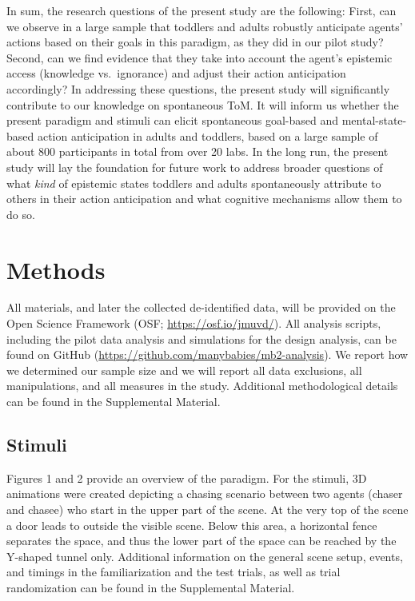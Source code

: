 \documentclass[
  man,floatsintext]{apa6}
\begin{document}
In sum, the research questions of the present study are the following: First, can we observe in a large sample that toddlers and adults robustly anticipate agents' actions based on their goals in this paradigm, as they did in our pilot study? Second, can we find evidence that they take into account the agent's epistemic access (knowledge vs.~ignorance) and adjust their action anticipation accordingly? In addressing these questions, the present study will significantly contribute to our knowledge on spontaneous ToM. It will inform us whether the present paradigm and stimuli can elicit spontaneous goal-based and mental-state-based action anticipation in adults and toddlers, based on a large sample of about 800 participants in total from over 20 labs. In the long run, the present study will lay the foundation for future work to address broader questions of what \emph{kind} of epistemic states toddlers and adults spontaneously attribute to others in their action anticipation and what cognitive mechanisms allow them to do so.

\section{Methods}\label{methods}

All materials, and later the collected de-identified data, will be provided on the Open Science Framework (OSF; \url{https://osf.io/jmuvd/}). All analysis scripts, including the pilot data analysis and simulations for the design analysis, can be found on GitHub (\url{https://github.com/manybabies/mb2-analysis}). We report how we determined our sample size and we will report all data exclusions, all manipulations, and all measures in the study. Additional methodological details can be found in the Supplemental Material.

\subsection{Stimuli}\label{stimuli}

Figures 1 and 2 provide an overview of the paradigm. For the stimuli, 3D animations were created depicting a chasing scenario between two agents (chaser and chasee) who start in the upper part of the scene. At the very top of the scene a door leads to outside the visible scene. Below this area, a horizontal fence separates the space, and thus the lower part of the space can be reached by the Y-shaped tunnel only. Additional information on the general scene setup, events, and timings in the familiarization and the test trials, as well as trial randomization can be found in the Supplemental Material.
\end{document}
